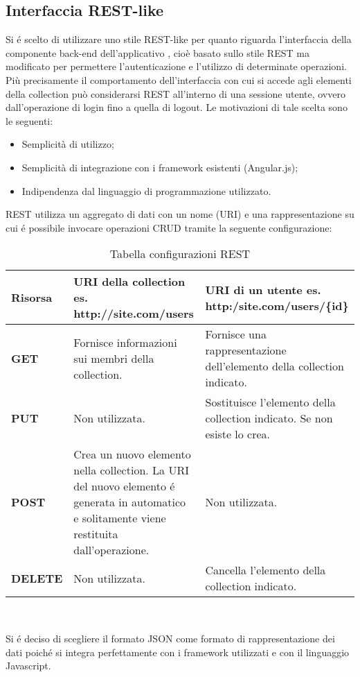 \subsection{Interfaccia REST-like}
Si é scelto di utilizzare uno stile \gls{REST-like} per quanto riguarda l'interfaccia della componente \gls{back-end} dell'applicativo \PROGETTO, cioè basato sullo stile \gls{REST} ma modificato per permettere l'autenticazione e l'utilizzo di determinate operazioni. Più precisamente il comportamento dell'interfaccia con cui si accede agli elementi della collection può considerarsi \gls{REST} all'interno di una sessione utente, ovvero dall'operazione di login fino a quella di logout. Le motivazioni di tale scelta sono le seguenti:
\begin{itemize}
	\item Semplicità di utilizzo;
	\item Semplicità di integrazione con i \gls{framework} esistenti (\gls{Angular}.js);
	\item Indipendenza dal \gls{linguaggio di programmazione} utilizzato.
	\end{itemize}
	\gls{REST} utilizza un aggregato di dati con un nome (\gls{URI}) e una rappresentazione su cui é possibile invocare operazioni \gls{CRUD} tramite la seguente configurazione:
	
	\begin{table}[h]
		\begin{tabular}{|p{}|p{}|p{}|}
			\toprule
			
			\textbf{Risorsa} & \textbf{\gls{URI} della collection} \smallbreak
			es. http://site.com/users  & \textbf{\gls{URI} di un utente} \smallbreak
			es. http:/site.com/users/\{id\} \\
			
			\midrule
			\textbf{GET} & Fornisce informazioni sui membri della collection. & Fornisce una rappresentazione dell'elemento della collection indicato. \\ \midrule
			\textbf{PUT} & Non utilizzata. & Sostituisce l'elemento della collection indicato. Se non esiste lo crea. \\  \midrule
			\textbf{POST} & Crea un nuovo elemento nella collection. La \gls{URI} del nuovo elemento é generata in automatico e solitamente viene restituita dall'operazione. & Non utilizzata. \\ \midrule
			\textbf{DELETE} & Non utilizzata. & Cancella l'elemento della collection indicato.  \\ \midrule
			
			
			\end{tabular}\\
			\caption{Tabella configurazioni \gls{REST}}
			
			\end{table}
			
Si é deciso di scegliere il formato \gls{JSON} come formato di rappresentazione dei dati poiché si integra perfettamente con i \gls{framework} utilizzati e con il linguaggio \gls{Javascript}.
